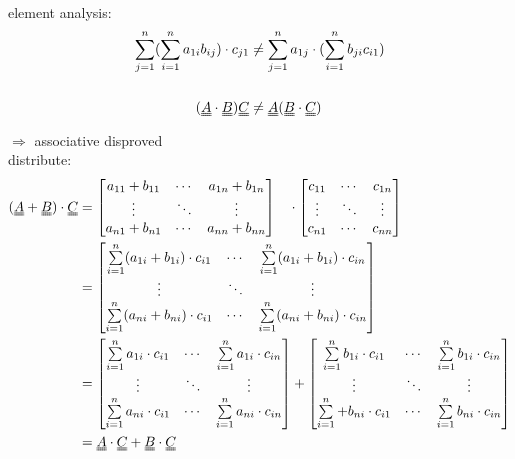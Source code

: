 \documentclass{article}
\begin{document}
\\[15pt]
element analysis:
\begin{equation}\notag
\begin{aligned}
\sum\limits_{j=1}^{n}(\sum\limits_{i=1}^{n} a_{1i}b_{ij})\cdot c_{j1} &\neq \sum\limits_{j=1}^{n}a_{1j}\cdot(\sum\limits_{i=1}^{n} b_{ji}c_{i1})
\\[15pt]
( \uuline{A}\cdot\uuline{B} ) \uuline{C} &\neq \uuline{A}( \uuline{B}\cdot\uuline{C} )
\\
\end{aligned}
\end{equation}
$\Rightarrow$ associative disproved
\\[20pt]
distribute:
\begin{equation}\notag
\begin{aligned}
( \uuline{A}+\uuline{B} )\cdot \uuline{C}&=
\begin{bmatrix}
a_{11}+b_{11}&\cdots&a_{1n}+b_{1n}\\
\vdots&\ddots&\vdots\\
a_{n1}+b_{n1}&\cdots&a_{nn}+b_{nn}
\end{bmatrix}
\quad 
\cdot
\begin{bmatrix}
c_{11}&\cdots&c_{1n}\\
\vdots&\ddots&\vdots\\
c_{n1}&\cdots&c_{nn}
\end{bmatrix} 
\quad
\\
&=
\begin{bmatrix} 
\sum\limits_{i=1}^{n}(a_{1i}+b_{1i})\cdot c_{i1}&\cdots& \sum\limits_{i=1}^{n}(a_{1i}+b_{1i})\cdot c_{in}\\
\vdots&\ddots&\vdots\\
\sum\limits_{i=1}^{n}(a_{ni}+b_{ni})\cdot c_{i1}&\cdots& \sum\limits_{i=1}^{n}(a_{ni}+b_{ni})\cdot c_{in}
\end{bmatrix} 
\quad
\\
&=
\begin{bmatrix} 
\sum\limits_{i=1}^{n}a_{1i}\cdot c_{i1}&\cdots& \sum\limits_{i=1}^{n}a_{1i}\cdot c_{in}\\
\vdots&\ddots&\vdots\\
\sum\limits_{i=1}^{n}a_{ni}\cdot c_{i1}&\cdots& \sum\limits_{i=1}^{n}a_{ni}\cdot c_{in}
\end{bmatrix}
+
\begin{bmatrix} 
\sum\limits_{i=1}^{n}b_{1i}\cdot c_{i1}&\cdots& \sum\limits_{i=1}^{n}b_{1i}\cdot c_{in}\\
\vdots&\ddots&\vdots\\
\sum\limits_{i=1}^{n}+b_{ni}\cdot c_{i1}&\cdots& \sum\limits_{i=1}^{n}b_{ni}\cdot c_{in}
\end{bmatrix} 
\\
&=\uuline{A}\cdot \uuline{C}+\uuline{B} \cdot \uuline{C} 
\end{aligned}
\end{equation}
\end{document}
